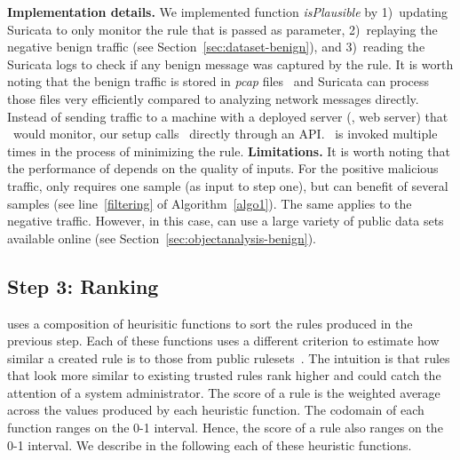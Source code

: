 \documentclass[sigconf,review, anonymous]{acmart}
\begin{document}
\textbf{Implementation details.} We implemented function
\emph{isPlausible} by 1)~updating Suricata to only monitor the rule
that is passed as parameter, 2)~replaying the negative benign traffic (see
Section~\ref{sec:dataset-benign}), and 3)~reading the Suricata logs to
check if any benign message was captured by the rule. It is worth
noting that the benign traffic is stored in \emph{pcap}
files~\cite{pcap} and Suricata can process those files very
efficiently compared to analyzing network messages directly. Instead
of sending traffic to a machine with a deployed server (\eg{}, web
server) that \suri\ would monitor, our setup calls \suri\ directly
through an API. \suri\ is invoked multiple times in the process of
minimizing the rule.  \textbf{Limitations.} It is worth noting that
the performance of \tname{} depends on the quality of inputs. For the
positive malicious traffic, \tname{} only requires one sample (as
input to step one), but can benefit of several samples (see
line~\ref{filtering} of Algorithm~\ref{algo1}). The same applies to
the negative traffic. However, in this case, \tname{} can use a large
variety of public data sets available online (see
Section~\ref{sec:objectanalysis-benign}).

\subsection{Step 3: Ranking}
\label{sec:ranking}

\tname{} uses a composition of heurisitic functions to sort the rules
produced in the previous step. Each of these functions uses a
different criterion to estimate how similar a created rule is to those
from public rulesets~\cite{emerging-threats-open}. The
intuition is that rules that look more similar to existing trusted
rules rank higher and could catch the attention of a system
administrator. The score of a rule is the weighted average across the
values produced by each heuristic function. The codomain of each
function ranges on the 0-1 interval. Hence, the score of a rule also
ranges on the 0-1 interval. We describe in the following each of these
heuristic functions.

\end{document}

